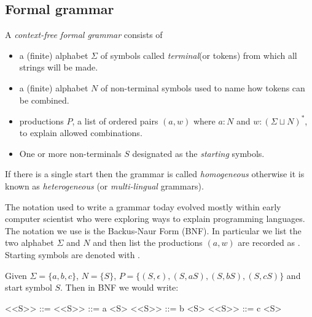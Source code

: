 \subsection{Formal grammar}
A \emph{context-free formal grammar} consists of 
\begin{itemize}
    \item {} a (finite) alphabet $\Sigma$ of symbols called \emph{terminal}(or tokens) from which all strings will be made.
    \item {} a (finite) alphabet $N$ of non-terminal symbols
    used to name how tokens can be combined.
    \item {} productions $P$, a list of ordered pairs 
    $(a,w)$ where $a:N$ and $w:(\Sigma\sqcup N)^*$, to explain allowed 
    combinations.
    \item One or more non-terminals $S$ designated as the \emph{starting}
    symbols.
\end{itemize}
If there is a single start then the grammar is called \emph{homogeneous}
otherwise it is known as \emph{heterogeneous} (or \emph{multi-lingual} grammars).

The notation used to write a grammar today evolved mostly within early 
computer scientist who were exploring ways to explain programming languages.
The notation we use is the Backus-Naur Form (BNF).
In particular we list the two alphabet $\Sigma$ and $N$ and then list the productions $(a,w)$ are recorded as .  Starting symbols 
are denoted with .




\begin{example}
    Given $\Sigma=\{a,b,c\}$, $N=\{S\}$, $P=\{(S,\epsilon),(S,aS), (S,bS),(S,cS)\}$
    and start symbol $S$.  Then in BNF we would write:
\begin{Gcode}[]
<<S>> ::= 
<<S>> ::= a <S>
<<S>> ::= b <S>
<<S>> ::= c <S>
\end{Gcode}
\end{example}

